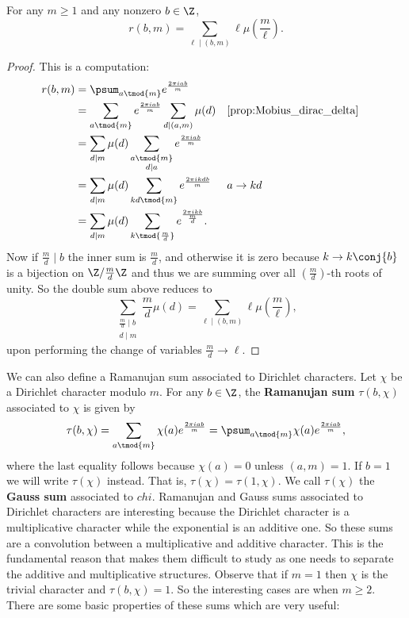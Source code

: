         \begin{proposition}\label{prop:Ramanujan_sum_evaluation}
          For any $m \ge 1$ and any nonzero $b \in \Z$,
          \[
            r(b,m) = \sum_{\ell \mid (b,m)}\ell\mu\left(\frac{m}{\ell}\right).
          \]
        \end{proposition}
        \begin{proof}
          This is a computation:
          \begin{align*}
            r(b,m) &= \psum_{a \tmod{m}}e^{\frac{2\pi iab}{m}} \\
            &= \sum_{a \tmod{m}}e^{\frac{2\pi iab}{m}}\sum_{d \mid (a,m)}\mu(d) && \text{\cref{prop:Mobius_dirac_delta}} \\
            &= \sum_{d \mid m}\mu(d)\sum_{\substack{a \tmod{m} \\ d \mid a}}e^{\frac{2\pi iab}{m}} \\
            &= \sum_{d \mid m}\mu(d)\sum_{kd \tmod{m}}e^{\frac{2\pi ikdb}{m}} && \text{$a \to kd$} \\
            &= \sum_{d \mid m}\mu(d)\sum_{k \tmod{\frac{m}{d}}}e^{\frac{2\pi ik b}{\frac{m}{d}}}.
          \end{align*}
          Now if $\frac{m}{d} \mid b$ the inner sum is $\frac{m}{d}$, and otherwise it is zero because $k \to k\conj{b}$ is a bijection on $\Z/\frac{m}{d}\Z$ and thus we are summing over all $\left(\frac{m}{d}\right)$-th roots of unity. So the double sum above reduces to
          \[
            \sum_{\substack{\frac{m}{d} \mid b \\ d \mid m}}\frac{m}{d}\mu(d) = \sum_{\ell \mid (b,m)}\ell\mu\left(\frac{m}{\ell}\right),
          \]
          upon performing the change of variables $\frac{m}{d} \to \ell$.
        \end{proof}
        We can also define a Ramanujan sum associated to Dirichlet characters. Let $\chi$ be a Dirichlet character modulo $m$. For any $b \in \Z$, the \textbf{Ramanujan sum} $\tau(b,\chi)$ associated to $\chi$ is given by
        \[
          \tau(b,\chi) = \sum_{a \tmod{m}}\chi(a)e^{\frac{2\pi iab}{m}} = \psum_{a \tmod{m}}\chi(a)e^{\frac{2\pi iab}{m}},
        \]
        where the last equality follows because $\chi(a) = 0$ unless $(a,m) = 1$. If $b = 1$ we will write $\tau(\chi)$ instead. That is, $\tau(\chi) = \tau(1,\chi)$. We call $\tau(\chi)$ the \textbf{Gauss sum} associated to $chi$. Ramanujan and Gauss sums associated to Dirichlet characters are interesting because the Dirichlet character is a multiplicative character while the exponential is an additive one. So these sums are a convolution between a multiplicative and additive character. This is the fundamental reason that makes them difficult to study as one needs to separate the additive and multiplicative structures. Observe that if $m = 1$ then $\chi$ is the trivial character and $\tau(b,\chi) = 1$. So the interesting cases are when $m \ge 2$. There are some basic properties of these sums which are very useful:

